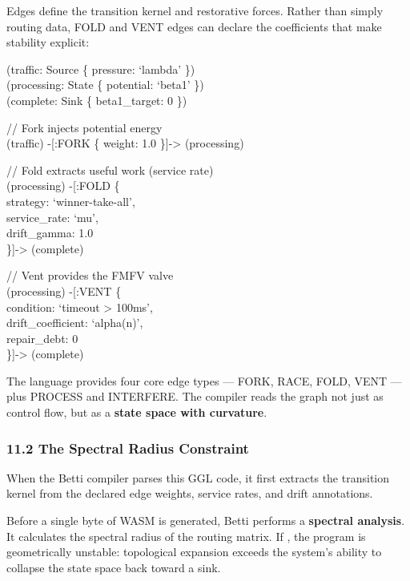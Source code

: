 \documentclass[
]{article}
\begin{document}
Edges define the transition kernel and restorative forces. Rather than
simply routing data, FOLD and VENT edges can declare the coefficients
that make stability explicit:

(traffic: Source \{ pressure: `lambda' \})\\
(processing: State \{ potential: `beta1' \})\\
(complete: Sink \{ beta1\_target: 0 \})

// Fork injects potential energy\\
(traffic) -{[}:FORK \{ weight: 1.0 \}{]}-\textgreater{} (processing)

// Fold extracts useful work (service rate)\\
(processing) -{[}:FOLD \{\\
strategy: `winner-take-all',\\
service\_rate: `mu',\\
drift\_gamma: 1.0\\
\}{]}-\textgreater{} (complete)

// Vent provides the FMFV valve\\
(processing) -{[}:VENT \{\\
condition: `timeout \textgreater{} 100ms',\\
drift\_coefficient: `alpha(n)',\\
repair\_debt: 0\\
\}{]}-\textgreater{} (complete)

The language provides four core edge types --- FORK, RACE, FOLD, VENT
--- plus PROCESS and INTERFERE. The compiler reads the graph not just as
control flow, but as a \textbf{state space with curvature}.

\subsubsection{\texorpdfstring{\textbf{11.2 The Spectral Radius
Constraint}}{11.2 The Spectral Radius Constraint}}\label{the-spectral-radius-constraint}

When the Betti compiler parses this GGL code, it first extracts the
transition kernel from the declared edge weights, service rates, and
drift annotations.

Before a single byte of WASM is generated, Betti performs a
\textbf{spectral analysis}. It calculates the spectral radius of the
routing matrix. If , the program is geometrically unstable: topological
expansion exceeds the system's ability to collapse the state space back
toward a sink.
\end{document}
